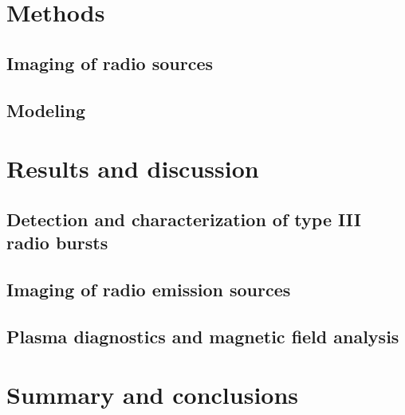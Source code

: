 \section{Methods}

\subsection{Imaging of radio sources}

\subsection{Modeling}


\section{Results and discussion}

\subsection{Detection and characterization of type III radio bursts}

\subsection{Imaging of radio emission sources}

\subsection{Plasma diagnostics and magnetic field analysis}


\section{Summary and conclusions}



